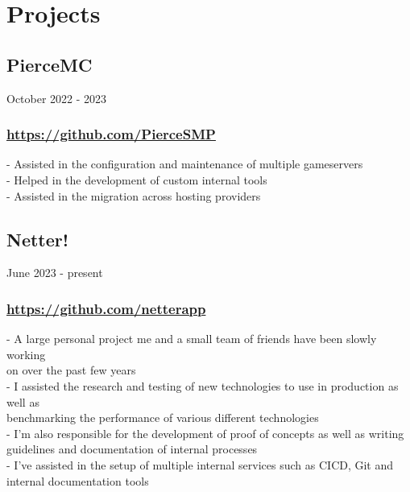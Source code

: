 \newpage

\section{Projects}

\subsection{PierceMC} October 2022 - 2023 \\
\subsubsection{\href{https://github.com/PierceSMP}{https://github.com/PierceSMP}}
-\:  Assisted in the configuration and maintenance of multiple gameservers \\
-\:  Helped in the development of custom internal tools \\
-\:  Assisted in the migration across hosting providers \\


\subsection{Netter!} June 2023 - present \\
\subsubsection{\href{https://github.com/netterapp}{https://github.com/netterapp}}
-\:  A large personal project me and a small team of friends have been slowly working \\ 
\ind on over the past few years \\
-\:  I assisted the research and testing of new technologies to use in production as well as \\ 
\ind benchmarking the performance of various different technologies \\
-\:  I'm also responsible for the development of proof of concepts as well as writing \\ 
\ind guidelines and documentation of internal processes \\
-\:  I've assisted in the setup of multiple internal services such as CICD, Git and \\
\ind internal documentation tools\\

